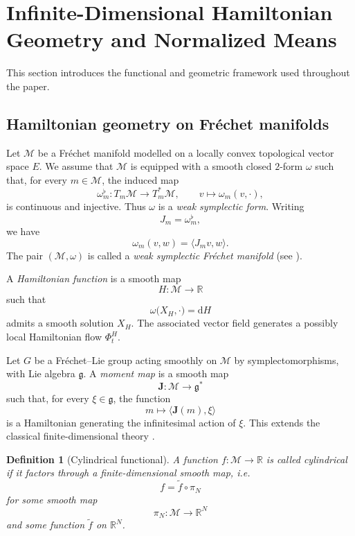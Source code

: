 \documentclass[11pt,reqno]{amsart}
\newtheorem{Definition}[Theorem]{Definition}
\begin{document}
\section{Infinite-Dimensional Hamiltonian Geometry and Normalized Means}

This section introduces the functional and geometric framework used
throughout the paper.

\subsection{Hamiltonian geometry on Fréchet manifolds}

Let $\mathcal M$ be a Fréchet manifold modelled on a locally convex
topological vector space $E$. We assume that $\mathcal M$ is equipped
with a smooth closed $2$-form $\omega$ such that, for every
$m\in\mathcal M$, the induced map
\[
\omega_m^\flat\colon T_m\mathcal M\longrightarrow T_m^*\mathcal M,
\qquad
v\longmapsto\omega_m(v,\cdot),
\]
is continuous and injective. Thus $\omega$ is a \emph{weak symplectic
form}. Writing
\[
J_m=\omega_m^\flat,
\]
we have
\[
\omega_m(v,w)=\langle J_m v,w\rangle.
\]
The pair $(\mathcal M,\omega)$ is called a \emph{weak symplectic
Fréchet manifold} (see \cite{Hamilton82,Neeb06,KM97}).

A \emph{Hamiltonian function} is a smooth map
\[
H\colon\mathcal M\longrightarrow\mathbb R
\]
such that
\begin{equation}
\omega\bigl(X_H,\cdot\bigr)=\mathrm dH
\label{eq:Hamiltonian}
\end{equation}
admits a smooth solution $X_H$. The associated vector field generates a
possibly local Hamiltonian flow $\Phi_t^H$.

Let $G$ be a Fréchet--Lie group acting smoothly on $\mathcal M$ by
symplectomorphisms, with Lie algebra $\mathfrak g$. A \emph{moment map}
is a smooth map
\[
\mathbf J\colon\mathcal M\longrightarrow\mathfrak g^*
\]
such that, for every $\xi\in\mathfrak g$, the function
\[
m\longmapsto\langle\mathbf J(m),\xi\rangle
\]
is a Hamiltonian generating the infinitesimal action of $\xi$. This
extends the classical finite-dimensional theory
\cite{AbrahamMarsden78,MarsdenRatiu99,Omori97}.

\begin{Definition}[Cylindrical functional]
A function $f\colon\mathcal M\to\mathbb R$ is called cylindrical if it
factors through a finite-dimensional smooth map, i.e.
\[
f=\widetilde f\circ\pi_N
\]
for some smooth map
\[
\pi_N\colon\mathcal M\longrightarrow\mathbb R^N
\]
and some function $\widetilde f$ on $\mathbb R^N$.
\end{Definition}
\end{document}
